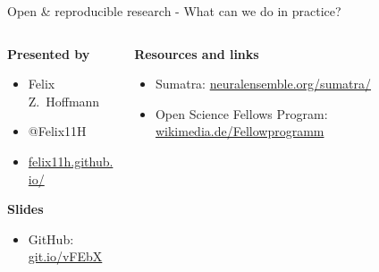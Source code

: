 \begin{frame}
  \begin{center} 
    \large Open \& reproducible research - What can we do in practice?
  \end{center}
  
  \vspace{0.4cm}

  \small
  \begin{columns}[t]
    \begin{column}{0.4\textwidth}        
      \textbf{Presented by}
      
      \begin{itemize}[leftmargin=0.6cm]
        \itemsep0pt
      \item[] Felix Z.~Hoffmann
        \item[] @Felix11H
        \item[] \href{http://felix11h.github.io/}{felix11h.github.io/}
      \end{itemize}

      \vspace{0.38cm}
      \textbf{Slides}
      
      \begin{itemize}[leftmargin=0.6cm]
        \item[] GitHub:\\ %
          \href{https://github.com/Felix11H/GSoC14_munich_slides}{git.io/vFEbX}
      \end{itemize}
    \end{column}
    \begin{column}{0.59\textwidth}
      \textbf{Resources and links}
      \vspace{-0.1cm}
       
      \begin{itemize}[leftmargin=0.6cm]
        \itemsep4pt
        \item[] Sumatra: %
          \href{http://neuralensemble.org/sumatra/}{%
            neuralensemble.org/sumatra/}\\
        \item[] Open Science Fellows Program: %
          \href{https://wikimedia.de/wiki/BildungWissenschaftKultur/Fellowprogramm}{%
            wikimedia.de/Fellowprogramm}
      \end{itemize}


\end{column}
\end{columns}
\end{frame}
